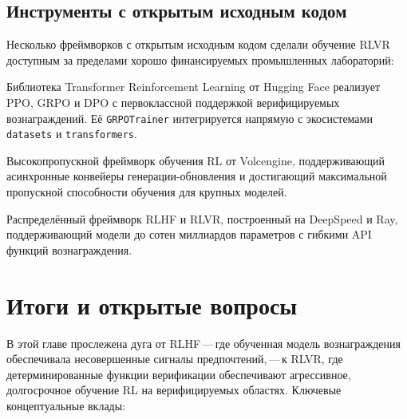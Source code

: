 \subsection{Инструменты с открытым исходным кодом}
\label{subsec:open-source-tooling}

Несколько фреймворков с открытым исходным кодом сделали обучение RLVR доступным
за пределами хорошо финансируемых промышленных лабораторий:

\begin{description}[leftmargin=!,labelwidth=2.5cm]
\item[TRL] Библиотека Transformer Reinforcement Learning от Hugging Face
  реализует PPO, GRPO и DPO с первоклассной поддержкой
  верифицируемых вознаграждений. Её \texttt{GRPOTrainer} интегрируется напрямую
  с экосистемами \texttt{datasets} и \texttt{transformers}.

\item[veRL] Высокопропускной фреймворк обучения RL от Volcengine,
  поддерживающий асинхронные конвейеры генерации-обновления и
  достигающий максимальной пропускной способности обучения для крупных моделей.

\item[OpenRLHF] Распределённый фреймворк RLHF и RLVR, построенный на
  DeepSpeed и Ray, поддерживающий модели до сотен миллиардов
  параметров с гибкими API функций вознаграждения.
\end{description}

\section{Итоги и открытые вопросы}
\label{sec:reasoning-summary}

В этой главе прослежена дуга от RLHF\,---\,где обученная
модель вознаграждения обеспечивала несовершенные сигналы предпочтений,\,---\,к RLVR,
где детерминированные функции верификации обеспечивают агрессивное,
долгосрочное обучение RL на верифицируемых областях. Ключевые концептуальные
вклады:

